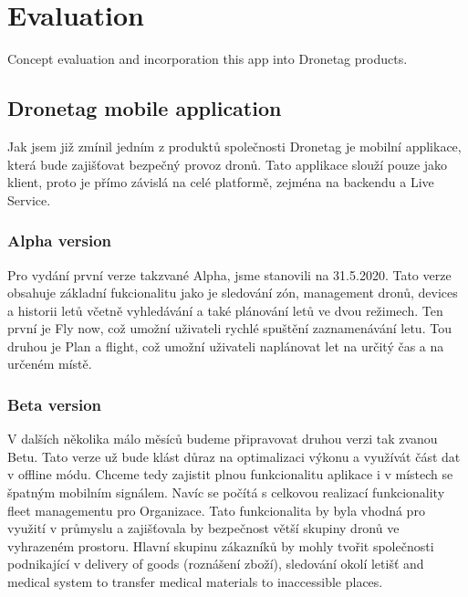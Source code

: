 \chapter{Evaluation}\label{ch:evaluation}
Concept evaluation and incorporation this app into Dronetag products.

\section{Dronetag mobile application}
Jak jsem již zmínil jedním z produktů společnosti Dronetag je mobilní applikace, která bude zajišťovat bezpečný provoz dronů.
Tato applikace slouží pouze jako klient, proto je přímo závislá na celé platformě, zejména na backendu a Live Service.

\subsection{Alpha version}\label{sec:alpha-version}
Pro vydání první verze takzvané Alpha, jsme stanovili na 31.5.2020.
Tato verze obsahuje základní fukcionalitu jako je sledování zón, management dronů, devices a historii letů včetně vyhledávání a také plánování letů ve dvou režimech.
Ten první je Fly now, což umožní uživateli rychlé spuštění zaznamenávání letu.
Tou druhou je Plan a flight, což umožní uživateli naplánovat let na určitý čas a na určeném místě.

\subsection{Beta version}\label{sec:beta-version}
V dalších několika málo měsíců budeme připravovat druhou verzi tak zvanou Betu.
Tato verze už bude klást důraz na optimalizaci výkonu a využívát část dat v offline módu.
Chceme tedy zajistit plnou funkcionalitu aplikace i v místech se špatným mobilním signálem.
Navíc se počítá s celkovou realizací funkcionality fleet managementu pro Organizace.
Tato funkcionalita by byla vhodná pro využití v průmyslu a zajišťovala by bezpečnost větší skupiny dronů ve vyhrazeném prostoru.
Hlavní skupinu zákazníků by mohly tvořit společnosti podnikající v delivery of goods (roznášení zboží), sledování okolí letišť and medical system to transfer medical materials to inaccessible places.

